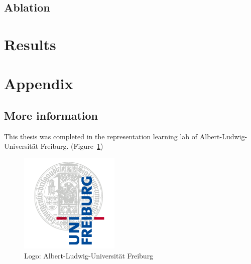 \documentclass[11pt]{article}
\begin{document}
\subsection{Ablation}

\section{Results}




\section{Appendix}
\subsection{More information}
This thesis was completed in the representation learning lab of Albert-Ludwig-Universität Freiburg.  (Figure~\ref{fig:UniLogo})

\begin{figure}[htb]
  \centering
    \includegraphics[scale=0.35]{images/logo}
    \caption{Logo: Albert-Ludwig-Universität Freiburg}
    \label{fig:UniLogo}
\end{figure}
\end{document}
